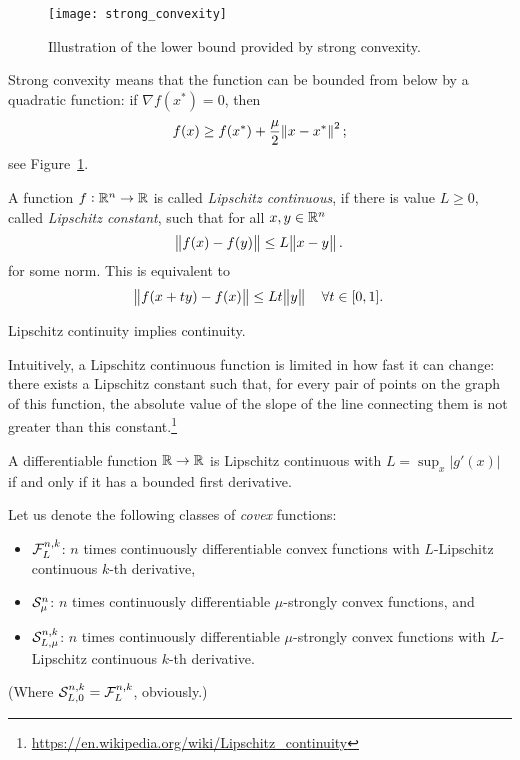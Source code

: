 \documentclass{article}
\begin{document}
\begin{figure}[H]
  \centering
  \texttt{[image: strong\_convexity]}
  \caption{Illustration of the lower bound provided by strong
    convexity.\label{fig:strong-convexity}}
\end{figure}

Strong convexity means that the function can be bounded from below by a quadratic function: if
\(\nabla f(x^*) = 0\), then
\begin{equation*}
  f(x) \geq f(x^*) + \frac{\mu}{2} \enVert{x - x^*}^2;
\end{equation*}
see Figure~\ref{fig:strong-convexity}.


\label{s:lipschitz-continuity}

A function \(f: \mathbb{R}^n \to \mathbb{R}\) is called \emph{Lipschitz continuous}, if there is value
\(L \geq 0\), called \emph{Lipschitz constant}, such that for all \(x, y \in \mathbb{R}^n\)
\begin{equation*}
  \enVert{f(x) - f(y)} \leq L \enVert[1]{x - y}.
\end{equation*}
for some norm.  This is equivalent to
\begin{equation*}
  \enVert{f(x + ty) - f(x)} \leq Lt \enVert[1]{y} \quad \forall t \in [0, 1].
\end{equation*}

Lipschitz continuity implies continuity.

Intuitively, a Lipschitz continuous function is limited in how fast it can change: there exists a
Lipschitz constant such that, for every pair of points on the graph of this function, the absolute
value of the slope of the line connecting them is not greater than this
constant.\footnote{\url{https://en.wikipedia.org/wiki/Lipschitz_continuity}}

A differentiable function \(\mathbb{R} \to \mathbb{R}\) is Lipschitz continuous with \(L = \sup_x |g'(x)|\) if
and only if it has a bounded first derivative.

\label{s:lipschitz-strong-convexity}

Let us denote the following classes of \emph{covex} functions:
\begin{itemize}
\item \(\mathcal{F}_{L}^{n, k}\): \(n\) times continuously differentiable convex functions with
  \(L\)-Lipschitz continuous \(k\)-th derivative,
\item \(\mathcal{S}_{\mu}^{n}\): \(n\) times continuously differentiable \(\mu\)-strongly
convex functions, and
\item \(\mathcal{S}_{L, \mu}^{n, k}\): \(n\) times continuously differentiable
  \(\mu\)-strongly convex functions with \(L\)-Lipschitz continuous \(k\)-th derivative.
\end{itemize}
(Where \(\mathcal{S}_{L, 0}^{n, k} = \mathcal{F}_{L}^{n, k}\), obviously.)
\end{document}
